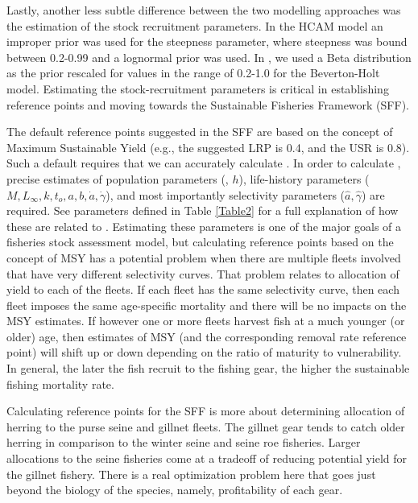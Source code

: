 Lastly, another less subtle difference between the two modelling approaches was the estimation of the stock recruitment parameters.  In the HCAM model an improper prior was used for the steepness parameter, where steepness was bound between 0.2-0.99 and a lognormal prior was used.  In \iscam, we used a Beta distribution as the prior rescaled for values in the range of 0.2-1.0 for the Beverton-Holt model.   Estimating the stock-recruitment parameters is critical in establishing reference points and moving towards the Sustainable Fisheries Framework (SFF). 

The default reference points suggested in the SFF are based on the concept of Maximum Sustainable Yield (e.g., the suggested LRP is 0.4\bmsy, and the USR is 0.8\bmsy).  Such a default requires that we can accurately calculate \bmsy.  In order to calculate \bmsy, precise estimates of population parameters (\bo, $h$), life-history parameters ($M,L_\infty,k,t_o,a,b,\dot{a},\dot{\gamma}$), and most importantly selectivity parameters ($\hat{a},\hat{\gamma}$) are required. See parameters defined in Table \ref{Table2} for a full explanation of how these are related to \bmsy.  Estimating these parameters is one of the major goals of a fisheries stock assessment model, but calculating reference points based on the concept of MSY has a potential problem when there are multiple fleets involved that have very different selectivity curves. That problem relates to allocation of yield to each of the fleets.  If each fleet has the same selectivity curve, then each fleet imposes the same age-specific mortality and there will be no impacts on the MSY estimates.  If however one or more fleets harvest fish at a much younger (or older) age, then estimates of MSY (and the corresponding removal rate reference point) will shift up or down depending on the ratio of maturity to vulnerability.  In general, the later the fish recruit to the fishing gear, the higher the sustainable fishing mortality rate.  

Calculating reference points for the SFF is more about determining allocation of herring to the purse seine and gillnet fleets.  The gillnet gear tends to catch older herring in comparison to the winter seine and seine roe fisheries.  Larger allocations to the seine fisheries come at a tradeoff of reducing potential yield for the gillnet fishery.  There is a real optimization problem here that goes just beyond the biology of the species, namely, profitability of each gear. 



